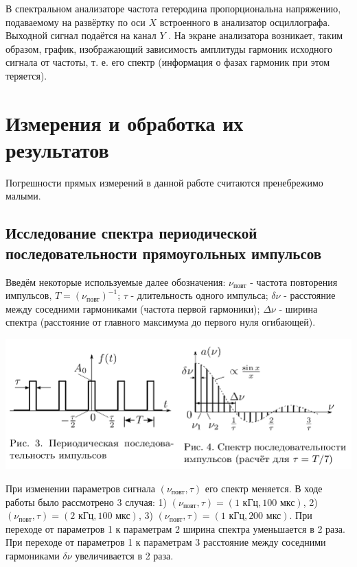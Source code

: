 \documentclass[15pt,a5paper,reqno]{article}
\begin{document}
    В спектральном анализаторе частота гетеродина пропорциональна напряжению, подаваемому на развёртку по оси $X$ встроенного в анализатор осциллографа. Выходной сигнал подаётся на канал $Y$ . На экране анализатора возникает, таким образом, график, изображающий зависимость амплитуды гармоник исходного сигнала от частоты, т. е. его спектр (информация о фазах гармоник при этом теряется).
    
\section{Измерения и обработка их результатов}

    Погрешности прямых измерений в данной работе считаются пренебрежимо малыми.

    \subsection{Исследование спектра периодической последовательности прямоугольных импульсов}

        Введём некоторые используемые далее обозначения: $\nu_{\text{повт}}$ - частота повторения импульсов, $T = (\nu_{\text{повт}})^{-1}$; $\tau$ - длительность одного импульса; $\delta\nu$ - расстояние между соседними гармониками (частота первой гармоники); $\Delta\nu$ - ширина спектра (расстояние от главного максимума до первого нуля огибающей).
        \begin{center}
            \includegraphics[width = \textwidth]{images/picture_3.png}
        \end{center}

        При изменении параметров сигнала $(\nu_{\text{повт}}, \tau)$ его спектр меняется. В ходе работы было рассмотрено 3 случая: 1) $(\nu_{\text{повт}}, \tau) = (1\text{ кГц}, 100\text{ мкс})$, 2) $(\nu_{\text{повт}}, \tau) = (2\text{ кГц}, 100\text{ мкс})$, 3) $(\nu_{\text{повт}}, \tau) = (1\text{ кГц}, 200\text{ мкс})$. При переходе от параметров 1 к параметрам 2 ширина спектра уменьшается в 2 раза. При переходе от параметров 1 к параметрам 3 расстояние между соседними гармониками $\delta\nu$ увеличивается в 2 раза.
\end{document}
